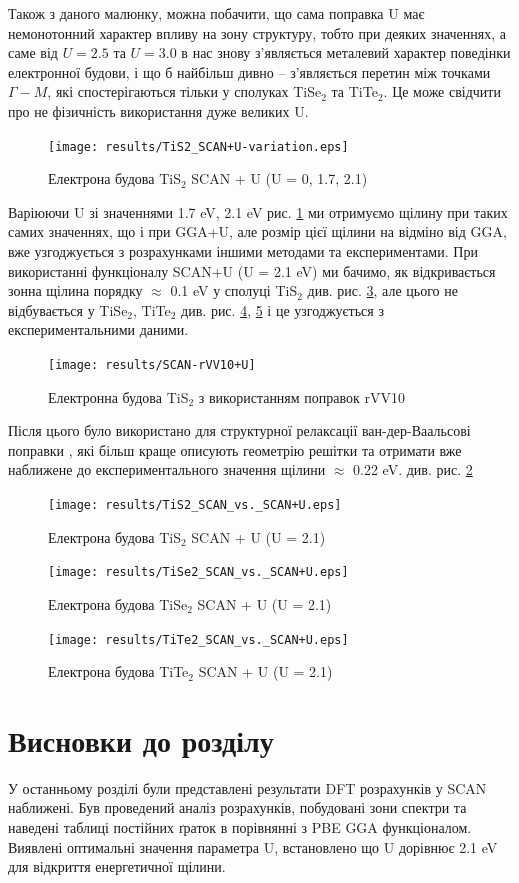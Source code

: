 Також з даного малюнку, можна побачити, що сама поправка U має немонотонний характер впливу на зону структуру, тобто при деяких значеннях, а саме від $U=2.5$ та $U=3.0$ в нас знову з'являється металевий характер поведінки електронної будови, і що б найбільш дивно -- з'являється перетин між точками $\Gamma-M$, які спостерігаються тільки у сполуках TiSe$_2$ та TiTe$_2$. Це може свідчити про не фізичність використання дуже великих U.

\begin{figure}[H]
	\texttt{[image: results/TiS2\_SCAN+U-variation.eps]}
	\caption{Електрона будова TiS$_2$ SCAN + U (U = 0, 1.7, 2.1)}\label{fig:SCAN+U_1.7_2.1}
\end{figure}

Варіюючи U зі значеннями 1.7 eV, 2.1 eV рис. \ref{fig:SCAN+U_1.7_2.1} ми отримуємо щілину при таких самих значеннях, що і при GGA+U, але розмір цієї щілини на відміно від GGA, вже узгоджується з розрахунками іншими методами та експериментами. При використанні функціоналу SCAN+U (U = 2.1 eV) ми бачимо, як відкривається зонна щілина порядку $\approx$ 0.1 eV у сполуці TiS$_2$ див. рис. \ref{fig:SCAN+U_tis2}, але цього не відбувається у TiSe$_2$, TiTe$_2$ див. рис. \ref{fig:SCAN+U_tise2}, \ref{fig:SCAN+U_tite2} і це узгоджується з експериментальними даними.

\begin{figure}[H]
	\texttt{[image: results/SCAN-rVV10+U]}
	\caption{Електронна будова TiS$_2$ з використанням поправок rVV10}\label{fig:rVV10+U}
\end{figure}

Після цього було використано для структурної релаксації ван-дер-Ваальсові поправки \cite{Peng_2016}, які більш краще описують геометрію решітки та отримати вже наближене до експериментального значення щілини $\approx$ 0.22 eV. див. рис. \ref{fig:rVV10+U}

\begin{figure}
	\texttt{[image: results/TiS2\_SCAN\_vs.\_SCAN+U.eps]}
	\caption{Електрона будова TiS$_2$ SCAN + U (U = 2.1)}\label{fig:SCAN+U_tis2}
\end{figure}

\begin{figure}
	\texttt{[image: results/TiSe2\_SCAN\_vs.\_SCAN+U.eps]}
	\caption{Електрона будова TiSe$_2$ SCAN + U (U = 2.1)}\label{fig:SCAN+U_tise2}
\end{figure}

\begin{figure}
	\texttt{[image: results/TiTe2\_SCAN\_vs.\_SCAN+U.eps]}
	\caption{Електрона будова TiTe$_2$ SCAN + U (U = 2.1)}\label{fig:SCAN+U_tite2}
\end{figure}

\section{Висновки до розділу}
У останньому розділі були представлені результати DFT розрахунків у SCAN наближені. Був проведений аналіз розрахунків, побудовані зони спектри та наведені таблиці постійних ґраток в порівнянні з PBE GGA функціоналом. Виявлені оптимальні значення параметра U, встановлено що U дорівнює 2.1 eV для відкриття енергетичної щілини. 